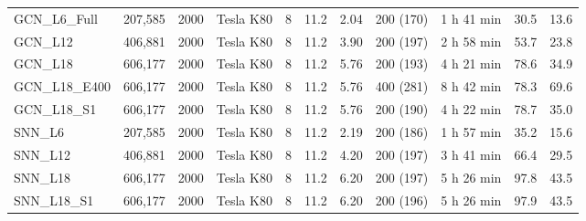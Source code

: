 \begin{tabular}{lllllllllll}
GCN\_L6\_Full & 207,585 & 2000 & Tesla K80 & 8 & 11.2 & 2.04 & 200 (170) & 1 h 41 min & 30.5 & 13.6 \\
GCN\_L12 & 406,881 & 2000 & Tesla K80 & 8 & 11.2 & 3.90 & 200 (197) & 2 h 58 min & 53.7 & 23.8 \\
GCN\_L18 & 606,177 & 2000 & Tesla K80 & 8 & 11.2 & 5.76 & 200 (193) & 4 h 21 min & 78.6 & 34.9 \\
GCN\_L18\_E400 & 606,177 & 2000 & Tesla K80 & 8 & 11.2 & 5.76 & 400 (281) & 8 h 42 min & 78.3 & 69.6 \\
GCN\_L18\_S1 & 606,177 & 2000 & Tesla K80 & 8 & 11.2 & 5.76 & 200 (190) & 4 h 22 min & 78.7 & 35.0 \\
SNN\_L6 & 207,585 & 2000 & Tesla K80 & 8 & 11.2 & 2.19 & 200 (186) & 1 h 57 min & 35.2 & 15.6 \\
SNN\_L12 & 406,881 & 2000 & Tesla K80 & 8 & 11.2 & 4.20 & 200 (197) & 3 h 41 min & 66.4 & 29.5 \\
SNN\_L18 & 606,177 & 2000 & Tesla K80 & 8 & 11.2 & 6.20 & 200 (197) & 5 h 26 min & 97.8 & 43.5 \\
SNN\_L18\_S1 & 606,177 & 2000 & Tesla K80 & 8 & 11.2 & 6.20 & 200 (196) & 5 h 26 min & 97.9 & 43.5 \\
\bottomrule
\end{tabular}
